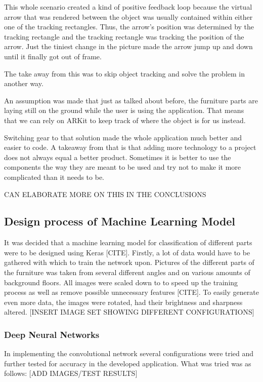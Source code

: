 This whole scenario created a kind of positive feedback loop because the virtual arrow that was rendered between the object was usually contained within either one of the tracking rectangles. Thus, the arrow's position was determined by the tracking rectangle and the tracking rectangle was tracking the position of the arrow.
Just the tiniest change in the picture made the arrow jump up and down until it finally got out of frame.

The take away from this was to skip object tracking and solve the problem in another way.

An assumption was made that just as talked about before, the furniture parts are laying still on the ground while the user is using the application. That means that we can rely on ARKit to keep track of where the object is for us instead.

Switching gear to that solution made the whole application much better and easier to code. A takeaway from that is that adding more technology to a project does not always equal a better product. Sometimes it is better to use the components the way they are meant to be used and try not to make it more complicated than it needs to be.

CAN ELABORATE MORE ON THIS IN THE CONCLUSIONS


\subsection{Design process of Machine Learning Model}
It was decided that a machine learning model for classification of different parts were to be designed using Keras [CITE]. Firstly, a lot of data would have to be gathered with which to train the network upon. Pictures of the different parts of the furniture was taken from several different angles and on various amounts of background floors. 
All images were scaled down to \imageSize to speed up the training process as well as remove possible unnecessary features [CITE]. To easily generate even more data, the images were rotated, had their brightness and sharpness altered. 
[INSERT IMAGE SET SHOWING DIFFERENT CONFIGURATIONS]
 
\subsubsection{Deep Neural Networks}
In implementing the convolutional network several configurations were tried and further tested for accuracy in the developed application. What was tried was as follows:
[ADD IMAGES/TEST RESULTS]


